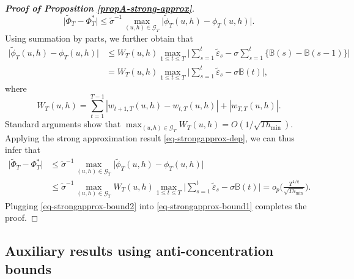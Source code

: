 \documentclass[a4paper,12pt]{article}
\numberwithin{equation}{section}
\begin{document}
\begin{proof}[\textnormal{\textbf{Proof of Proposition \ref{propA-strong-approx}}}]
\[ \big| \widetilde{\Phi}_T - \Phi_T^{*} \big| \le \widetilde{\sigma}^{-1} \max_{(u,h) \in \mathcal{G}_T} \big| \widetilde{\phi}_T(u,h) - \phi_T(u,h) \big|. \]
Using summation by parts,
we further obtain that 
\begin{align*}
\big| \widetilde{\phi}_T(u,h) - \phi_T(u,h) \big| 
 & \le W_T(u,h) \max_{1 \le t \le T} \Big| \sum\limits_{s=1}^t \widetilde{\varepsilon}_s - \sigma \sum\limits_{s=1}^t \big\{ \mathbb{B}(s) - \mathbb{B}(s-1) \big\} \Big| \\
 & = W_T(u,h) \max_{1 \le t \le T} \Big| \sum\limits_{s=1}^t \widetilde{\varepsilon}_s - \sigma \mathbb{B}(t) \Big|,
\end{align*}
where
\[ W_T(u,h) = \sum\limits_{t=1}^{T-1} |w_{t+1,T}(u,h) - w_{t,T}(u,h)| + |w_{T,T}(u,h)|. \]
Standard arguments show that $\max_{(u,h) \in \mathcal{G}_T} W_T(u,h) = O( 1/\sqrt{Th_{\min}} )$. Applying the strong approximation result \eqref{eq-strongapprox-dep}, we can thus infer that 
\begin{align}
\big| \widetilde{\Phi}_T - \Phi_T^{*} \big| 
 & \le \widetilde{\sigma}^{-1} \max_{(u,h) \in \mathcal{G}_T} \big| \widetilde{\phi}_T(u,h) - \phi_T(u,h) \big| \nonumber \\
 & \le \widetilde{\sigma}^{-1} \max_{(u,h) \in \mathcal{G}_T} W_T(u,h) \max_{1 \le t \le T} \Big| \sum\limits_{s=1}^t \widetilde{\varepsilon}_s - \sigma \mathbb{B}(t) \Big| 
 = o_p \Big( \frac{T^{1/q}}{\sqrt{Th_{\min}}} \Big). \label{eq-strongapprox-bound2}
\end{align}
Plugging \eqref{eq-strongapprox-bound2} into \eqref{eq-strongapprox-bound1} completes the proof.
\end{proof}



\subsection*{Auxiliary results using anti-concentration bounds}
\end{document}
